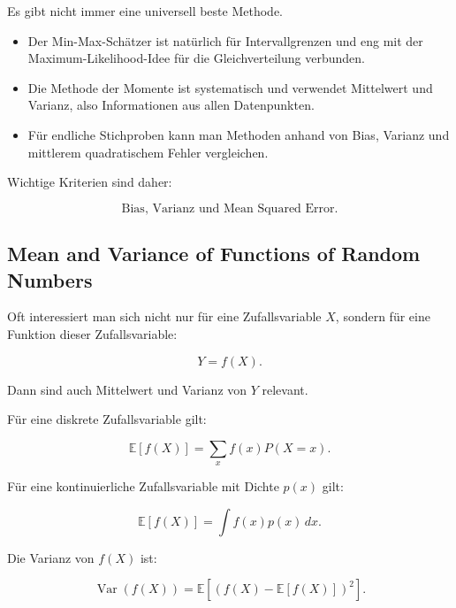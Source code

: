 \documentclass[11pt,a4paper]{scrartcl}
\begin{document}
\begin{answerbox}
    Es gibt nicht immer eine universell beste Methode.

    \begin{itemize}
        \item Der Min-Max-Schätzer ist natürlich für Intervallgrenzen und eng mit
        der Maximum-Likelihood-Idee für die Gleichverteilung verbunden.

        \item Die Methode der Momente ist systematisch und verwendet Mittelwert
        und Varianz, also Informationen aus allen Datenpunkten.

        \item Für endliche Stichproben kann man Methoden anhand von Bias, Varianz
        und mittlerem quadratischem Fehler vergleichen.
    \end{itemize}

    Wichtige Kriterien sind daher:

    \[
        \boxed{
            \text{Bias, Varianz und Mean Squared Error.}
        }
    \]
\end{answerbox}

\subsection{Mean and Variance of Functions of Random Numbers}

\begin{notebox}
    Oft interessiert man sich nicht nur für eine Zufallsvariable \(X\), sondern
    für eine Funktion dieser Zufallsvariable:

    \[
        Y = f(X).
    \]

    Dann sind auch Mittelwert und Varianz von \(Y\) relevant.
\end{notebox}

\begin{calculationbox}
    Für eine diskrete Zufallsvariable gilt:

    \[
        \mathbb{E}[f(X)]
        =
        \sum_x f(x)P(X=x).
    \]

    Für eine kontinuierliche Zufallsvariable mit Dichte \(p(x)\) gilt:

    \[
        \mathbb{E}[f(X)]
        =
        \int f(x)p(x)\,dx.
    \]

    Die Varianz von \(f(X)\) ist:

    \[
        \operatorname{Var}(f(X))
        =
        \mathbb{E}\left[
            \left(f(X)-\mathbb{E}[f(X)]\right)^2
        \right].
    \]
\end{calculationbox}
\end{document}
